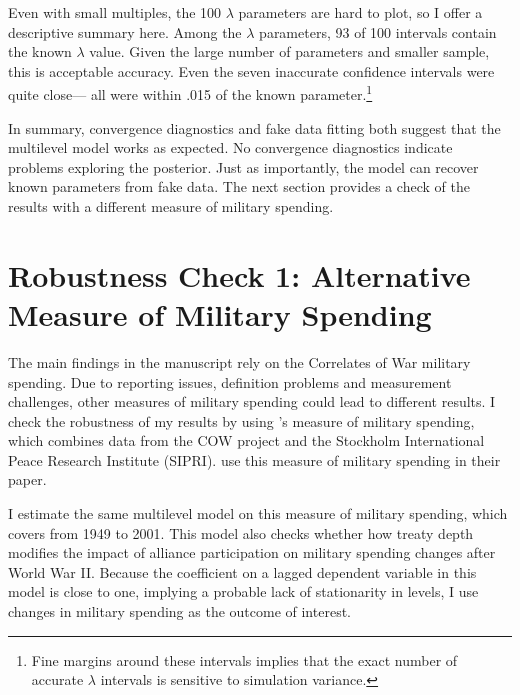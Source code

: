 \documentclass[12pt]{article}
\begin{document}
 
Even with small multiples, the 100 $\lambda$ parameters are hard to plot, so I offer a descriptive summary here. 
Among the $\lambda$ parameters, 93 of 100 intervals contain the known $\lambda$ value.
Given the large number of parameters and smaller sample, this is acceptable accuracy. 
Even the seven inaccurate confidence intervals were quite close--- all were within .015 of the known parameter.\footnote{Fine margins around these intervals implies that the exact number of accurate $\lambda$ intervals is sensitive to simulation variance.}


In summary, convergence diagnostics and fake data fitting both suggest that the multilevel model works as expected. 
No convergence diagnostics indicate problems exploring the posterior. 
Just as importantly, the model can recover known parameters from fake data. 
The next section provides a check of the results with a different measure of military spending. 




\section*{Robustness Check 1: Alternative Measure of Military Spending}

The main findings in the manuscript rely on the Correlates of War military spending. 
Due to reporting issues, definition problems and measurement challenges, other measures of military spending could lead to different results. 
I check the robustness of my results by using \citet{Nordhausetal2012}'s measure of military spending, which combines data from the COW project and the Stockholm International Peace Research Institute (SIPRI). 
\citet{DigiuseppePoast2016} use this measure of military spending in their paper. 


I estimate the same multilevel model on this measure of military spending, which covers from 1949 to 2001. 
This model also checks whether how treaty depth modifies the impact of alliance participation on military spending changes after World War II.
Because the coefficient on a lagged dependent variable in this model is close to one, implying a probable lack of stationarity in levels, I use changes in military spending as the outcome of interest. 
\end{document}

